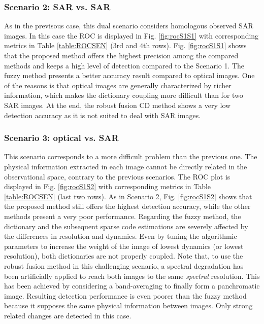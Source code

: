 \documentclass[review]{elsarticle}
\begin{document}
\subsubsection{Scenario 2: SAR vs. SAR}
As in the previsous case, this dual scenario considers homologous observed SAR images. In this case the ROC is displayed in Fig. \ref{fig:rocS1S1} with corresponding metrics in Table \ref{table:ROCSEN} ($3$rd and $4$th rows). Fig. \ref{fig:rocS1S1} shows that the proposed method offers the highest precision among the compared methods and keeps a high level of detection compared to the Scenario 1. The fuzzy method presents a better accuracy result compared to optical images. One of the reasons is that optical images are generally characterized by richer information, which makes the dictionary coupling more difficult than for two SAR images. At the end, the robust fusion CD method shows a very low detection accuracy as it is not suited to deal with SAR images.

\subsubsection{Scenario 3: optical vs. SAR}
This scenario corresponds to a more difficult problem than the previous one. The physical information extracted in each image cannot be directly related in the observational space, contrary to the previous scenarios. The ROC plot is displayed in Fig. \ref{fig:rocS1S2} with corresponding metrics in Table \ref{table:ROCSEN} (last two rows). As in Scenario 2, Fig. \ref{fig:rocS1S2} shows that the proposed method still offers the highest detection accuracy, while the other methods present a very poor performance. Regarding the fuzzy method, the dictionary and the subsequent sparse code estimations are severely affected by the differences in resolution and dynamics. Even by tuning the algorithmic parameters to increase the weight of the image of lowest dynamics (or lowest resolution), both dictionaries are not properly coupled. Note that, to use the robust fusion method in this challenging scenario, a spectral degradation has been artificially applied to reach both images to the same \emph{spectral} resolution. This has been achieved by considering a band-averaging to finally form a panchromatic image. Resulting detection performance is even poorer than the fuzzy method because it supposes the same physical information between images. Only strong related changes are detected in this case.

\newcommand{\one}[1]{\bf{\textcolor[rgb]{0.00,0.00,1.00}{#1}}}
\newcommand{\two}[1]{\textcolor[rgb]{0.00,0.00,1.00}{#1}}
\setlength{\tabcolsep}{5pt}
\renewcommand{\arraystretch}{1.3}
\end{document}
